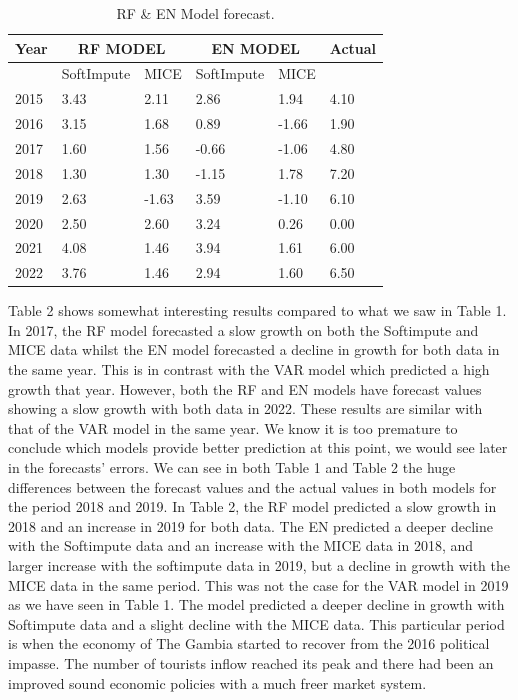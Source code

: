 \documentclass[12pt,italian, twoside]{report}
\begin{document}
\begin{enumerate}
	 \begin{table}
		\centering
		\begin{tabular}{|l|l|l|l|l|l|}
			\hline
			Year &\multicolumn{2}{c|}{RF  MODEL}& \multicolumn{2}{c|}{EN MODEL} &  Actual \\ \hline
			          & SoftImpute & MICE       &   SoftImpute &    MICE  &                 \\ 
			2015 &   3.43           & 2.11         & 2.86               &   1.94    & 4.10        \\
			2016 &   3.15            & 1.68         &  0.89              & -1.66    & 1.90        \\
			2017 &     1.60            & 1.56         &  -0.66            &  -1.06  & 4.80       \\ 
			2018  &    1.30            & 1.30          &   -1.15           &  1.78     & 7.20      \\
			2019   &  2.63             & -1.63          & 3.59            &  -1.10   &  6.10          \\
			2020   &  2.50              & 2.60           & 3.24            &  0.26    & 0.00         \\
			2021  &    4.08              &  1.46            & 3.94          &  1.61      & 6.00           \\
			2022 &     3.76               & 1.46             &  2.94         &  1.60      &  6.50         \\ \hline
		\end{tabular}
		\caption{RF \& EN Model forecast.}
		\label{tab: RF_EN}
	\end{table}
		Table 2 shows somewhat interesting results compared to what we saw in Table 1. In 2017, the RF model forecasted a slow growth on both the Softimpute and MICE data whilst the EN model forecasted a decline in growth for both data in the same year. This is in contrast with the VAR model which predicted a high growth that year. However, both the RF and EN models have forecast values showing a slow growth with both data in 2022. These results are similar with that of the VAR model in the same year. We know it is too premature to conclude which models provide better prediction at this point, we would see later in the forecasts’ errors. We can see in both Table 1 and Table 2 the huge differences between the forecast values and the actual values in both models for the period 2018 and 2019. In Table 2, the RF model predicted a slow growth in 2018 and an increase in 2019 for both data. The EN predicted a deeper decline with the Softimpute data and an increase with the MICE data in 2018, and larger increase with the softimpute data in 2019, but a decline in growth with the MICE data in the same period. This was not the case for the VAR model in 2019 as we have seen in Table 1. The model predicted a deeper decline in growth with Softimpute data and a slight decline with the MICE data. This particular period is when the economy of The Gambia started to recover from the 2016 political impasse. The number of tourists inflow reached its peak and there had been an improved sound economic policies with a much freer market system.\\

\end{enumerate}
\end{document}
